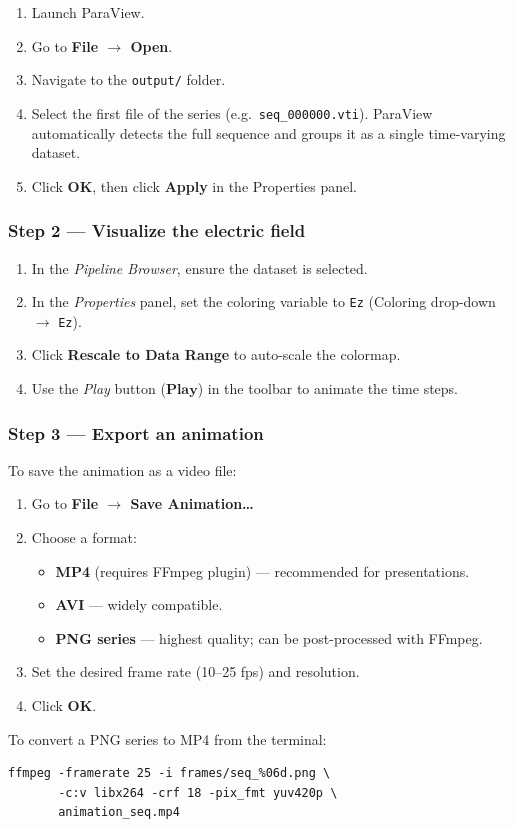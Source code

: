 \documentclass[12pt,a4paper]{article}
\begin{document}
\begin{enumerate}
    \item Launch ParaView.
    \item Go to \textbf{File $\to$ Open}.
    \item Navigate to the \texttt{output/} folder.
    \item Select the first file of the series (e.g.\
          \texttt{seq\_000000.vti}).
          ParaView automatically detects the full sequence and
          groups it as a single time-varying dataset.
    \item Click \textbf{OK}, then click \textbf{Apply} in the
          Properties panel.
\end{enumerate}

\subsubsection*{Step 2 — Visualize the electric field}

\begin{enumerate}
    \item In the \emph{Pipeline Browser}, ensure the dataset is
          selected.
    \item In the \emph{Properties} panel, set the coloring variable
          to \texttt{Ez} (Coloring drop-down $\to$ \texttt{Ez}).
    \item Click \textbf{Rescale to Data Range} to auto-scale the
          colormap.
    \item Use the \emph{Play} button ($\textbf{Play}$) in the
          toolbar to animate the time steps.
\end{enumerate}


\subsubsection*{Step 3 — Export an animation}

To save the animation as a video file:

\begin{enumerate}
    \item Go to \textbf{File $\to$ Save Animation\ldots}
    \item Choose a format:
    \begin{itemize}
        \item \textbf{MP4} (requires FFmpeg plugin) — recommended
              for presentations.
        \item \textbf{AVI} — widely compatible.
        \item \textbf{PNG series} — highest quality; can be
              post-processed with FFmpeg.
    \end{itemize}
    \item Set the desired frame rate (10--25 fps) and resolution.
    \item Click \textbf{OK}.
\end{enumerate}

To convert a PNG series to MP4 from the terminal:

\begin{verbatim}
ffmpeg -framerate 25 -i frames/seq_%06d.png \
       -c:v libx264 -crf 18 -pix_fmt yuv420p \
       animation_seq.mp4
\end{verbatim}
\end{document}
